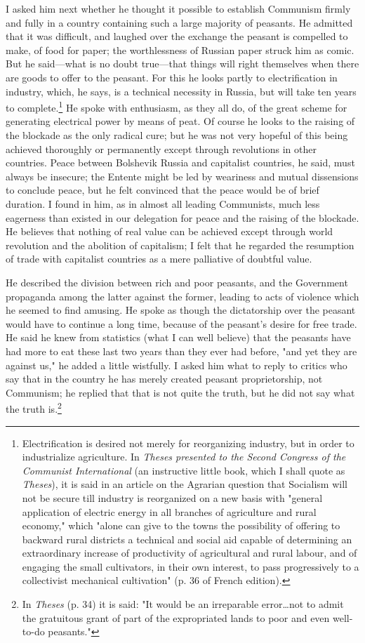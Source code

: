 I asked him next whether he thought it possible to establish Communism firmly and fully in a country containing such a large majority of peasants. He admitted that it was difficult, and laughed over the exchange the peasant is compelled to make, of food for paper; the worthlessness of Russian paper struck him as comic. But he said---what is no doubt true---that things will right themselves when there are goods to offer to the peasant. For this he looks partly to electrification in industry, which, he says, is a technical necessity in Russia, but will take ten years to complete.\footnote{Electrification is desired not merely for reorganizing industry, but in order to industrialize agriculture. In \emph{Theses presented to the Second Congress of the Communist International} (an instructive little book, which I shall quote as \emph{Theses}), it is said in an article on the Agrarian question that Socialism will not be secure till industry is reorganized on a new basis with "general application of electric energy in all branches of agriculture and rural economy," which "alone can give to the towns the possibility of offering to backward rural districts a technical and social aid capable of determining an extraordinary increase of productivity of agricultural and rural labour, and of engaging the small cultivators, in their own interest, to pass progressively to a collectivist mechanical cultivation" (p. 36 of French edition).} He spoke with enthusiasm, as they all do, of the great scheme for generating electrical power by means of peat. Of course he looks to the raising of the blockade as the only radical cure; but he was not very hopeful of this being achieved thoroughly or permanently except through revolutions in other countries. Peace between Bolshevik Russia and capitalist countries, he said, must always be insecure; the Entente might be led by weariness and mutual dissensions to conclude peace, but he felt convinced that the peace would be of brief duration. I found in him, as in almost all leading Communists, much less eagerness than existed in our delegation for peace and the raising of the blockade. He believes that nothing of real value can be achieved except through world revolution and the abolition of capitalism; I felt that he regarded the resumption of trade with capitalist countries as a mere palliative of doubtful value.

He described the division between rich and poor peasants, and the Government propaganda among the latter against the former, leading to acts of violence which he seemed to find amusing. He spoke as though the dictatorship over the peasant would have to continue a long time, because of the peasant's desire for free trade. He said he knew from statistics (what I can well believe) that the peasants have had more to eat these last two years than they ever had before, "and yet they are against us," he added a little wistfully. I asked him what to reply to critics who say that in the country he has merely created peasant proprietorship, not Communism; he replied that that is not quite the truth, but he did not say what the truth is.\footnote{In \emph{Theses} (p. 34) it is said: "It would be an irreparable error\ldots not to admit the gratuitous grant of part of the expropriated lands to poor and even well-to-do peasants."}

